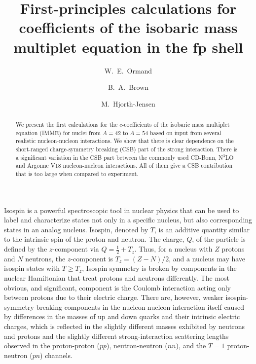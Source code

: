 \documentclass[10pt,showpacs,preprintnumbers,footinbib,amsmath,amssymb,aps,prl,twocolumn,groupedaddress,superscriptaddress,showkeys]{revtex4-1}
\begin{document}
\title{First-principles calculations for coefficients of the isobaric
mass multiplet equation in the fp shell}


\author{W.~E.~Ormand}
\author{B.~A.~Brown} 
\author{M.~Hjorth-Jensen}

\begin{abstract}
We present the first calculations for the $c$-coefficients of the isobaric
mass multiplet equation (IMME)
for nuclei from $A=42$ to $A=54$ based on input from several realistic nucleon-nucleon interactions.
We show that there is clear dependence on the short-ranged charge-symmetry
breaking (CSB) part of the strong interaction. There is a significant
variation in the CSB part between the commonly
used CD-Bonn, N$^3$LO and Argonne V18 nucleon-nucleon
interactions. All of them give a CSB contribution that is too large when 
compared to experiment.
\end{abstract}



\maketitle

Isospin is a powerful spectroscopic tool in nuclear physics that can
be used to label and characterize states not only in a specific
nucleus, but also corresponding states in an analog nucleus. Isospin,
denoted by $T$, is an additive quantity similar to the intrinsic spin
of the proton and neutron. The charge, $Q$, of the particle is defined
by the $z$-component via $Q=\frac{1}{2} + T_z$. Thus, for a nucleus
with $Z$ protons and $N$ neutrons, the $z$-component is $T_z=(Z-N)/2$,
and a nucleus may have isospin states with $T \ge T_z$, Isospin
symmetry is broken by components in the nuclear Hamiltonian that treat
protons and neutrons differently. The most obvious, and significant,
component is the Coulomb interaction acting only between protons due
to their electric charge. There are, however, weaker isospin-symmetry
breaking components in the nucleon-nucleon interaction itself caused
by differences in the masses of up and down quarks and their intrinsic
electric charges, which is reflected in the slightly different masses
exhibited by neutrons and protons \cite{miller2006} and the slightly
different strong-interaction scattering lengths observed in the
proton-proton ($pp$), neutron-neutron ($nn$), and the $T=1$
proton-neutron ($pn$) channels.
\end{document}
